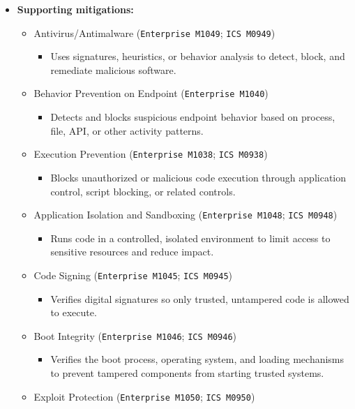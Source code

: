 \documentclass[10pt,a4paper,oneside]{report}
\begin{document}
\begin{itemize}
\item \textbf{Supporting mitigations:}
\begin{itemize}
\item Antivirus/Antimalware (\texttt{Enterprise M1049}; \texttt{ICS M0949})
\begin{itemize}
\item Uses signatures, heuristics, or behavior analysis to detect, block, and remediate malicious software.
\end{itemize}
\item Behavior Prevention on Endpoint (\texttt{Enterprise M1040})
\begin{itemize}
\item Detects and blocks suspicious endpoint behavior based on process, file, API, or other activity patterns.
\end{itemize}
\item Execution Prevention (\texttt{Enterprise M1038}; \texttt{ICS M0938})
\begin{itemize}
\item Blocks unauthorized or malicious code execution through application control, script blocking, or related controls.
\end{itemize}
\item Application Isolation and Sandboxing (\texttt{Enterprise M1048}; \texttt{ICS M0948})
\begin{itemize}
\item Runs code in a controlled, isolated environment to limit access to sensitive resources and reduce impact.
\end{itemize}
\item Code Signing (\texttt{Enterprise M1045}; \texttt{ICS M0945})
\begin{itemize}
\item Verifies digital signatures so only trusted, untampered code is allowed to execute.
\end{itemize}
\item Boot Integrity (\texttt{Enterprise M1046}; \texttt{ICS M0946})
\begin{itemize}
\item Verifies the boot process, operating system, and loading mechanisms to prevent tampered components from starting trusted systems.
\end{itemize}
\item Exploit Protection (\texttt{Enterprise M1050}; \texttt{ICS M0950})
\begin{itemize}

\end{itemize}
\end{itemize}
\end{itemize}
\end{document}

